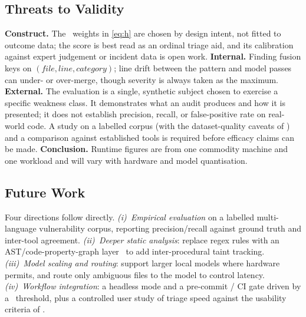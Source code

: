 \subsection{Threats to Validity}
\textbf{Construct.} The \phindex\ weights in \cref{eq:h} are chosen by
design intent, not fitted to outcome data; the score is best read as an
ordinal triage aid, and its calibration against expert judgement or
incident data is open work. \textbf{Internal.} Finding fusion keys on
$(\textit{file}, \textit{line}, \textit{category})$; line drift between
the pattern and model passes can under- or over-merge, though severity is
always taken as the maximum. \textbf{External.} The evaluation is a
single, synthetic subject chosen to exercise a specific weakness class.
It demonstrates what an audit produces and how it is presented; it does
not establish precision, recall, or false-positive rate on real-world
code. A study on a labelled corpus (with the dataset-quality caveats of
\cite{croft2023,steenhoek2023}) and a comparison against established
tools is required before efficacy claims can be made. \textbf{Conclusion.}
Runtime figures are from one commodity machine and one workload and will
vary with hardware and model quantisation.

\subsection{Future Work}
Four directions follow directly. \emph{(i)~Empirical evaluation} on a
labelled multi-language vulnerability corpus, reporting precision/recall
against ground truth and inter-tool agreement. \emph{(ii)~Deeper static
analysis}: replace regex rules with an AST/code-property-graph
layer~\cite{yamaguchi2014} to add inter-procedural taint tracking.
\emph{(iii)~Model scaling and routing}: support larger local models where
hardware permits, and route only ambiguous files to the model to control
latency. \emph{(iv)~Workflow integration}: a headless mode and a
pre-commit / CI gate driven by a \phindex\ threshold, plus a controlled
user study of triage speed against the usability criteria of
\cite{johnson2013,nachtigall2022}.
